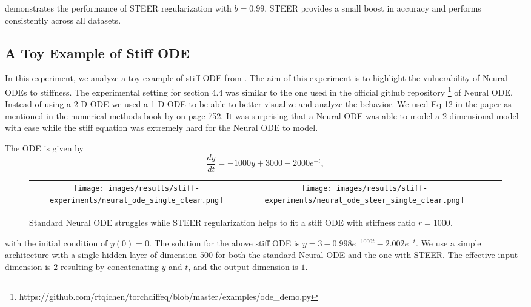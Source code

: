  demonstrates the performance of STEER regularization with $b=0.99$. STEER provides a small boost in accuracy and performs consistently across all datasets. 



\subsection{A Toy Example of Stiff ODE}

In this experiment, we analyze a toy example of stiff ODE from \cite{chapra2010numerical}. The aim of this experiment is to highlight the vulnerability of Neural ODEs to stiffness. The experimental setting for section 4.4 was similar to the one used in the official github repository \footnote{https://github.com/rtqichen/torchdiffeq/blob/master/examples/ode\_demo.py} of Neural ODE. Instead of using a 2-D ODE we used a 1-D ODE to be able to better visualize and analyze the behavior. We used Eq 12 in the paper as mentioned in the numerical methods book by \cite{chapra2010numerical} on page 752. It was surprising that a Neural ODE was able to model a 2 dimensional model with ease while the stiff equation was extremely hard for the Neural ODE to model.

The ODE is given by 
\begin{equation}
	\frac{dy}{dt}= -1000y + 3000 - 2000e^{-t},
	\label{eq:stiff}
\end{equation}



\begin{figure}
	\centering
	\begin{tabular}{*{4}{c@{\hspace{3px}}}}
		\texttt{[image: images/results/stiff-experiments/neural\_ode\_single\_clear.png]} &
		\texttt{[image: images/results/stiff-experiments/neural\_ode\_steer\_single\_clear.png]}
		\\
	\end{tabular}
	\caption{Standard Neural ODE struggles while STEER regularization helps to fit a stiff ODE with stiffness ratio $r=1000$.}
	\label{fig:toy_steer}
\end{figure}

with the initial condition of $y(0)=0$. 
The solution for the above stiff ODE is  $y = 3 - 0.998e^{-1000t} -2.002 e^{-t}$.
We use a simple architecture with a single hidden layer of dimension $500$ for both the standard Neural ODE and the one with STEER. The effective input dimension is $2$ resulting by concatenating $y$ and $t$, and the output dimension is $1$. 



